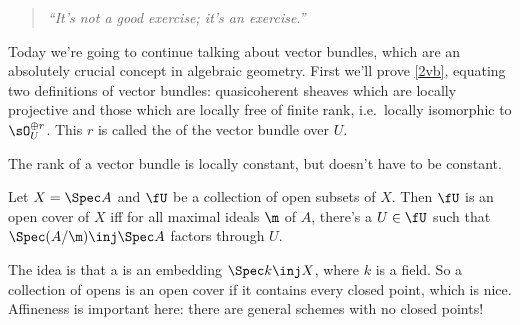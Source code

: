 \begin{quote}\textit{
	``It's not a good exercise; it's an exercise.''
}\end{quote}
Today we're going to continue talking about vector bundles, which are an absolutely crucial concept in algebraic
geometry. First we'll prove \cref{2vb}, equating two definitions of vector bundles: quasicoherent sheaves which are
locally projective and those which are locally free of finite rank, i.e.\ locally isomorphic to $\sO_{U}^{\oplus
r}$. This $r$ is called the  of the vector bundle over $U$.
\begin{rem}
The rank of a vector bundle is locally constant, but doesn't have to be constant.
\end{rem}
\begin{lem}
Let $X = \Spec A$ and $\fU$ be a collection of open subsets of $X$. Then $\fU$ is an open cover of $X$ iff for all
maximal ideals $\m$ of $A$, there's a $U\in\fU$ such that $\Spec(A/\m)\inj\Spec A$ factors through $U$.
\end{lem}
The idea is that a  is an embedding $\Spec k\inj X$, where $k$ is a field. So a collection of
opens is an open cover if it contains every closed point, which is nice. Affineness is important here: there are
general schemes with no closed points!
